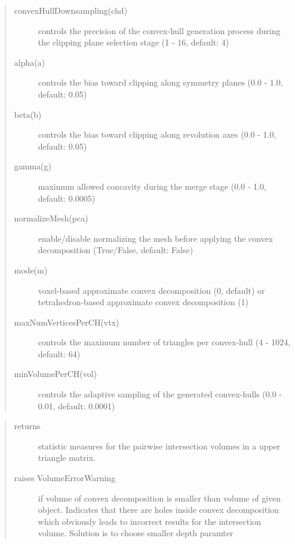 \documentclass[letterpaper,10pt,english]{sphinxmanual}
\begin{document}
\begin{description}
\begin{quote}
\begin{description}
\item[{convexHullDownsampling(chd)}] \leavevmode
controls the precision of the convex-hull generation process during the clipping plane selection stage (1 - 16, default: 4)

\item[{alpha(a)}] \leavevmode
controls the bias toward clipping along symmetry planes (0.0 - 1.0, default: 0.05)

\item[{beta(b)}] \leavevmode
controls the bias toward clipping along revolution axes (0.0 - 1.0, default: 0.05)

\item[{gamma(g)}] \leavevmode
maximum allowed concavity during the merge stage (0.0 - 1.0, default: 0.0005)

\item[{normalizeMesh(pca)}] \leavevmode
enable/disable normalizing the mesh before applying the convex decomposition (True/False, default: False)

\item[{mode(m)}] \leavevmode
voxel-based approximate convex decomposition (0, default) or tetrahedron-based approximate convex decomposition (1)

\item[{maxNumVerticesPerCH(vtx)}] \leavevmode
controls the maximum number of triangles per convex-hull (4 - 1024, default: 64)

\item[{minVolumePerCH(vol)}] \leavevmode
controls the adaptive sampling of the generated convex-hulls (0.0 - 0.01, default: 0.0001)

\end{description}\end{quote}

\end{description}
\begin{quote}\begin{description}
\item[{returns}] \leavevmode
statistic measures for the pairwise intersection volumes in a upper triangle matrix.

\item[{raises VolumeErrorWarning}] \leavevmode
if volume of convex decomposition is smaller than volume of given object. Indicates that there are holes inside convex decomposition which obviously leads to incorrect results for the intersection volume. Solution is to choose smaller depth paramter

\end{description}\end{quote}
\end{document}
